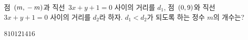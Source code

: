 점~$(m{,}\mkern3mu -m)$과 직선~$3x+y+1=0$ 사이의 거리를 $d_1$, 점~$(0{,}\mkern3mu 9)$와 직선~$3x+y+1=0$ 사이의 거리를 $d_2$라 하자. $d_1<d_2$가 되도록 하는 정수 $m$의 개수는?
\begin{choices32}{$8$}{$10$}{$12$}{$14$}{$16$}\end{choices32}
